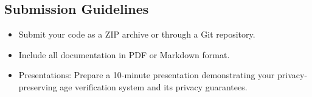 \documentclass[10pt,a4paper,american]{exam}
\begin{document}
\subsection*{Submission Guidelines}
\begin{itemize}
	\item Submit your code as a ZIP archive or through a Git repository.
	\item Include all documentation in PDF or Markdown format.
	\item Presentations: Prepare a 10-minute presentation demonstrating your privacy-preserving age verification system and its privacy guarantees.
\end{itemize}
\end{document}
